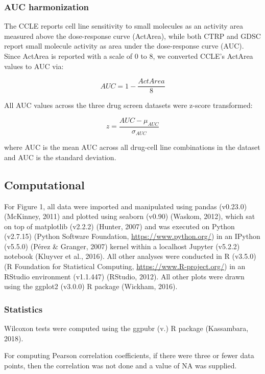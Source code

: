 \documentclass[man]{apa6}
\begin{document}
\subsubsection{AUC harmonization}\label{auc-harmonization}

The CCLE reports cell line sensitivity to small molecules as an activity
area measured above the dose-response curve (ActArea), while both CTRP
and GDSC report small molecule activity as area under the dose-response
curve (AUC). Since ActArea is reported with a scale of 0 to 8, we
converted CCLE's ActArea values to AUC via:

\[AUC=1- \frac{ActArea}{8}\]

All AUC values across the three drug screen datasets were z-score
transformed:

\[z = \frac{AUC - \mu_{AUC}}{\sigma_{AUC}}\]

where AUC is the mean AUC across all drug-cell line combinations in the
dataset and AUC is the standard deviation.

\subsection{Computational}\label{computational}

For Figure 1, all data were imported and manipulated using pandas
(v0.23.0) (McKinney, 2011) and plotted using seaborn (v0.90) (Waskom,
2012), which sat on top of matplotlib (v2.2.2) (Hunter, 2007) and was
executed on Python (v2.7.15) (Python Software Foundation,
\url{https://www.python.org/}) in an IPython (v5.5.0) (Pérez \& Granger,
2007) kernel within a localhost Jupyter (v5.2.2) notebook (Kluyver et
al., 2016). All other analyses were conducted in R (v3.5.0) (R
Foundation for Statistical Computing, \url{https://www.R-project.org/})
in an RStudio environment (v1.1.447) (RStudio, 2012). All other plots
were drawn using the ggplot2 (v3.0.0) R package (Wickham, 2016).

\subsubsection{Statistics}\label{statistics}

Wilcoxon tests were computed using the ggpubr (v.) R package
(Kassambara, 2018).

For computing Pearson correlation coefficients, if there were three or
fewer data points, then the correlation was not done and a value of NA
was supplied.

\newpage
\end{document}
